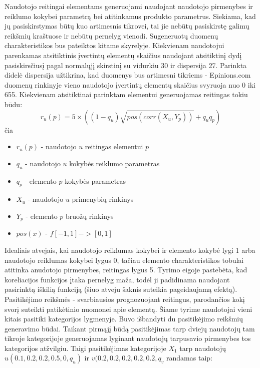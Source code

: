 \documentclass{VUMIFInfMagistrinis}
\begin{document}
\indent
Naudotojo reitingai elementams generuojami naudojant naudotojo pirmenybes ir reiklumo kokybei parametrą bei atitinkamus produkto parametrus. Siekiama, kad jų pasiskirstymas būtų kuo artimesnis tikrovei, tai jie nebūtų pasiskirstę galimų reikšmių kraštuose ir nebūtų pernelyg vienodi. Sugeneruotų duomenų charakteristikos bus pateiktos kitame skyrelyje. 
\newline
\indent
Kiekvienam naudotojui parenkamas atsitiktinis įvertintų elementų skaičius naudojant atsitiktinį dydį pasiskirsčiusį pagal normalųjį skirstinį su vidurkiu 30 ir dispersija 27. Parinkta didelė dispersija užtikrina, kad duomenys bus artimesni tikriems - Epinions.com duomenų rinkinyje vieno naudotojo įvertintų elementų skaičius svyruoja nuo 0 iki 655. Kiekvienam atsitiktinai parinktam elementui generuojamas reitingas tokiu būdu:
\begin{equation}
r_u(p) = 5 \times ((1-q_u) \sqrt{pos(corr(X_u,Y_p))} + q_u q_p)
\end{equation}
čia
\begin{itemize}
	\item $r_u(p)$ - naudotojo $u$ reitingas elementui $p$
	\item $q_u$ - naudotojo $u$ kokybės reiklumo parametras
	\item $q_p$ - elemento $p$ kokybės parametras
	\item $X_u$ - naudotojo $u$ primenybių rinkinys 
	\item $Y_p$ - elemento $p$ bruožų rinkinys
	\item $pos(x)$ - $f[-1,1] -> [0,1]$
\end{itemize}
\indent
Idealiais atvejais, kai naudotojo reiklumas kokybei ir elemento kokybė lygi 1 arba naudotojo reiklumas kokybei lygus 0, tačiau elemento charakteristikos tobulai atitinka anudotojo pirmenybes, reitingas lygus 5. Tyrimo eigoje pastebėta, kad koreliacijos funkcijos įtaka pernelyg maža, todėl ji padidinama naudojant pasirinktą iškilią funkciją (šiuo atveju šaknis suteikia pageidaujamą efektą).
\indent
Pasitikėjimo reikšmės - svarbiausios prognozuojant reitingus, parodančios kokį svorį suteikti patikėtinio nuomonei apie elementą. Šiame tyrime naudotojai vieni kitais pasitiki kategorijos lygmenyje. Buvo išbandyti du pasitikėjimo reikšmių generavimo būdai.
\newline
\indent
Taikant pirmąjį būdą pasitikėjimas tarp dviejų naudotojų tam tikroje kategorijoje generuojamas lyginant naudotojų tarpusavio pirmenybes tos kategorijos atžvilgiu. Taigi pasitikėjimas kategorijoje $X_1$ tarp naudotojų $u(0.1, 0.2, 0.2, 0.5, 0, q_u)$ ir $v(0.2, 0.2, 0.2, 0.2, 0.2, q_v$ randamas taip:
\end{document}
